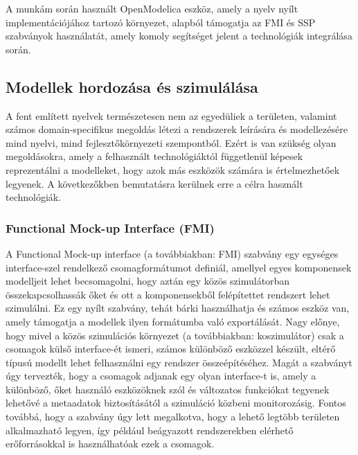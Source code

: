         A munkám során használt OpenModelica eszköz, amely a nyelv nyílt implementációjához tartozó
        környezet, alapból támogatja az FMI és SSP szabványok használatát, amely komoly segítséget jelent a technológiák
        integrálása során.

    \subsection{Modellek hordozása és szimulálása}
    A fent említett nyelvek természetesen nem az egyedüliek a területen, valamint számos domain-specifikus megoldás létezi a rendszerek leírására és modellezésére mind nyelvi, mind fejlesztőkörnyezeti szempontból.
    Ezért is van szükség olyan megoldásokra, amely a felhasznált technológiáktól függetlenül képesek reprezentálni a modelleket, hogy azok más eszközök számára is értelmezhetőek legyenek. A következőkben bemutatásra kerülnek erre a célra használt technológiák.
    
        \subsubsection{Functional Mock-up Interface (FMI)}
        A Functional Mock-up interface (a továbbiakban: FMI) szabvány egy egységes interface-szel
        rendelkező csomagformátumot definiál, amellyel egyes komponensek modelljeit lehet becsomagolni,
        hogy aztán egy közös szimulátorban összekapcsolhassák őket és ott a komponensekből felépítettet
        rendszert lehet szimulálni. Ez egy nyílt szabvány, tehát bárki használhatja és számos eszköz van,
        amely támogatja a modellek ilyen formátumba való exportálását. Nagy előnye, hogy mivel a közös
        szimulációs környezet (a továbbiakban: koszimulátor) csak a csomagok külső interface-ét ismeri,
        számos különböző eszközzel készült, eltérő típusú modellt lehet felhasználni egy rendszer
        összeépítéséhez. Magát a szabványt úgy tervezték, hogy a csomagok adjanak egy olyan interface-t is,
        amely a különböző, őket használó eszközöknek szól és változatos funkciókat tegyenek lehetővé a
        metaadatok biztosításától a szimuláció közbeni monitorozásig. Fontos továbbá, hogy a szabvány úgy
        lett megalkotva, hogy a lehető legtöbb területen alkalmazható legyen, így például beágyazott
        rendszerekben elérhető erőforrásokkal is használhatóak ezek a csomagok.


